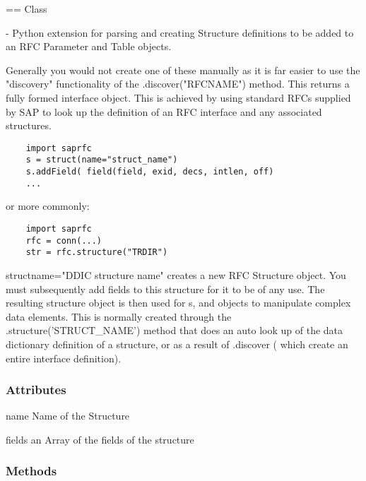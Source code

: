 \documentclass{howto}
\begin{document}
== Class 

 - Python extension for parsing and creating Structure definitions to be added to an RFC Parameter and Table objects.

Generally you would not create one of these manually as it is far easier to use the "discovery" functionality of the .discover("RFCNAME") method.  This returns a fully formed interface object.  This is achieved by using standard RFCs supplied by SAP to look up the definition of an RFC interface and any associated structures.

\begin{verbatim}
	import saprfc
	s = struct(name="struct_name")
	s.addField( field(field, exid, decs, intlen, off)
	...
\end{verbatim}

or more commonly:

\begin{verbatim}
	import saprfc
	rfc = conn(...)
	str = rfc.structure("TRDIR")
\end{verbatim}

\begin{funcdesc}{struct}{name="DDIC structure name"}
creates a new RFC Structure object. You must subsequently add fields to this structure
for it to be of any use.  The resulting structure object is then used for s,
and  objects to manipulate complex data elements.
This is normally created through the .structure('STRUCT_NAME') method that does an auto look up of the data dictionary definition of a structure, or as a result of .discover ( which create an entire interface definition).
\end{funcdesc}


\subsubsection{Attributes \label{structattrs}}

\begin{memberdesc}[struct]{name}
    Name of the Structure
\end{memberdesc}

\begin{memberdesc}[struct]{fields}
    an Array of the fields of the structure
\end{memberdesc}


\subsubsection{Methods \label{structmeths}}
\end{document}
